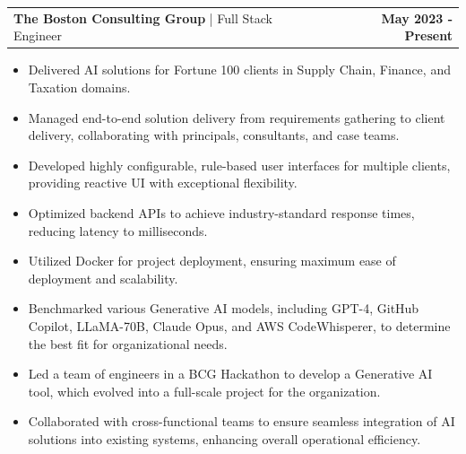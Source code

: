 \documentclass[a4paper,12pt]{article}
\makeatletter
\newenvironment{jobshort}[2]
    {
    \begin{tabularx}{\linewidth}{@{}l X r@{}}
    \textbf{#1} & \hfill &  #2 \\[2.75pt]
    \end{tabularx}
    }
    {
    }
\newenvironment{joblong}[3]
    {
    \begin{tabularx}{\linewidth}{@{}l X r@{}}
    \textbf{#1} | #2 & \hfill &  \textbf{#3} \\[3.75pt]
    \end{tabularx}
    \begin{minipage}[t]{\linewidth}
    \begin{itemize}[nosep,after=\strut, leftmargin=1em, itemsep=3pt,label=-]
    }
    {
    \end{itemize}
    \end{minipage}    
    }
\makeatother
\begin{document}


\begin{joblong}{The Boston Consulting Group}{Full Stack Engineer}{May 2023 - Present}
    
\item Delivered AI solutions for Fortune 100 clients in Supply Chain, Finance, and Taxation domains.
\item Managed end-to-end solution delivery from requirements gathering to client delivery, collaborating with principals, consultants, and case teams.
\item Developed highly configurable, rule-based user interfaces for multiple clients, providing reactive UI with exceptional flexibility.
\item Optimized backend APIs to achieve industry-standard response times, reducing latency to milliseconds.
\item Utilized Docker for project deployment, ensuring maximum ease of deployment and scalability.
\item Benchmarked various Generative AI models, including GPT-4, GitHub Copilot, LLaMA-70B, Claude Opus, and AWS CodeWhisperer, to determine the best fit for organizational needs.
\item Led a team of engineers in a BCG Hackathon to develop a Generative AI tool, which evolved into a full-scale project for the organization.
\item Collaborated with cross-functional teams to ensure seamless integration of AI solutions into existing systems, enhancing overall operational efficiency.

\end{joblong}
\end{document}
